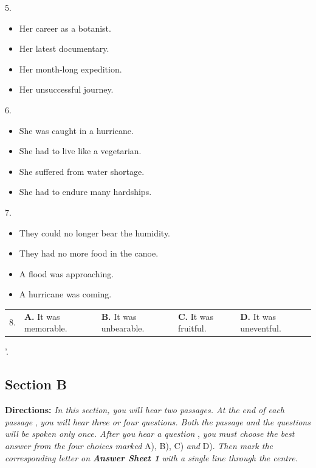 \documentclass[UTF8,11pt]{ctexart}
\begin{document}
5.


\begin{itemize}[leftmargin=2em,itemsep=.2em,topsep=.4em]\item[A.] Her career as a botanist.
\item[B.] Her latest documentary.
\item[C.] Her month-long expedition.
\item[D.] Her unsuccessful journey.
\end{itemize}

6.


\begin{itemize}[leftmargin=2em,itemsep=.2em,topsep=.4em]\item[A.] She was caught in a hurricane.
\item[B.] She had to live like a vegetarian.
\item[C.] She suffered from water shortage.
\item[D.] She had to endure many hardships.
\end{itemize}

7.


\begin{itemize}[leftmargin=2em,itemsep=.2em,topsep=.4em]\item[A.] They could no longer bear the humidity.
\item[B.] They had no more food in the canoe.
\item[C.] A flood was approaching.
\item[D.] A hurricane was coming.
\end{itemize}

\noindent\begin{tabularx}{\linewidth}{@{}lXXXX@{}}8. & \textbf{A.} It was memorable. & \textbf{B.} It was unbearable. & \textbf{C.} It was fruitful. & \textbf{D.} It was uneventful.\\\end{tabularx}\par

'.


\subsection*{\textbf{Section B}}


\textbf{Directions: }\textit{In this section, you will hear two passages. At the end of each passage }, \textit{you will hear three or} \textit{four questions. Both the passage and the questions will be spoken only once. After you hear a question }, \textit{you} \textit{must choose the best answer from the four choices marked }A), B), C) \textit{and }D). \textit{Then mark the} \textit{corresponding letter on }\textbf{\textit{Answer Sheet 1 }}\textit{with a single line through the centre.}
\end{document}
